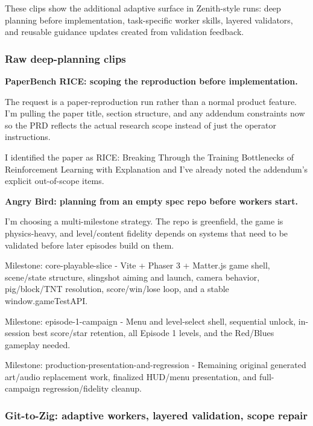 \documentclass[11pt,a4paper]{article}
\begin{document}
These clips show the additional adaptive surface in Zenith-style runs: deep planning before implementation, task-specific worker skills, layered validators, and reusable guidance updates created from validation feedback.

\subsubsection{Raw deep-planning clips}

\textbf{PaperBench RICE: scoping the reproduction before implementation.}

\begin{cbox}
The request is a paper-reproduction run rather than a normal product feature.
I'm pulling the paper title, section structure, and any addendum constraints
now so the PRD reflects the actual research scope instead of just the
operator instructions.
\end{cbox}

\begin{cbox}
I identified the paper as RICE: Breaking Through the Training Bottlenecks
of Reinforcement Learning with Explanation and I've already noted the
addendum's explicit out-of-scope items.
\end{cbox}

\textbf{Angry Bird: planning from an empty spec repo before workers start.}

\begin{cbox}
I'm choosing a multi-milestone strategy. The repo is greenfield, the game is
physics-heavy, and level/content fidelity depends on systems that need to be
validated before later episodes build on them.

Milestone: core-playable-slice
- Vite + Phaser 3 + Matter.js game shell, scene/state structure, slingshot
  aiming and launch, camera behavior, pig/block/TNT resolution, score/win/lose
  loop, and a stable window.gameTestAPI.

Milestone: episode-1-campaign
- Menu and level-select shell, sequential unlock, in-session best score/star
  retention, all Episode 1 levels, and the Red/Blues gameplay needed.

Milestone: production-presentation-and-regression
- Remaining original generated art/audio replacement work, finalized HUD/menu
  presentation, and full-campaign regression/fidelity cleanup.
\end{cbox}

\subsubsection{Git-to-Zig: adaptive workers, layered validation, scope repair}
\end{document}
